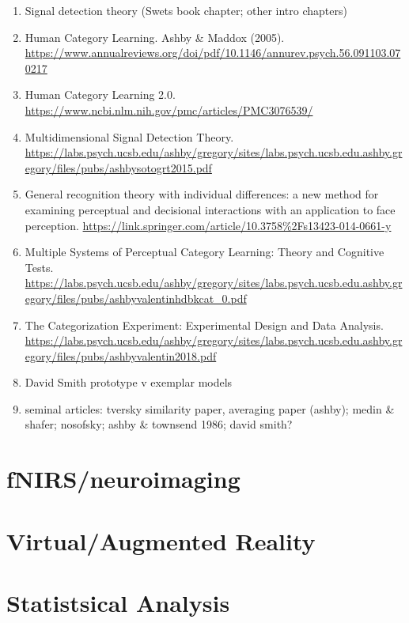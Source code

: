 \documentclass[
]{book}
\providecommand{\tightlist}{%
  \setlength{\itemsep}{0pt}\setlength{\parskip}{0pt}}
\begin{document}
\begin{enumerate}
\def\labelenumi{\arabic{enumi}.}
\setcounter{enumi}{-1}
\tightlist
\item
  Signal detection theory (Swets book chapter; other intro chapters)
\item
  Human Category Learning. Ashby \& Maddox (2005). \url{https://www.annualreviews.org/doi/pdf/10.1146/annurev.psych.56.091103.070217}
\item
  Human Category Learning 2.0. \url{https://www.ncbi.nlm.nih.gov/pmc/articles/PMC3076539/}
\item
  Multidimensional Signal Detection Theory. \url{https://labs.psych.ucsb.edu/ashby/gregory/sites/labs.psych.ucsb.edu.ashby.gregory/files/pubs/ashbysotogrt2015.pdf}
\item
  General recognition theory with individual differences: a new method for examining perceptual and decisional interactions with an application to face perception. \url{https://link.springer.com/article/10.3758\%2Fs13423-014-0661-y}
\item
  Multiple Systems of Perceptual
  Category Learning: Theory and
  Cognitive Tests. \url{https://labs.psych.ucsb.edu/ashby/gregory/sites/labs.psych.ucsb.edu.ashby.gregory/files/pubs/ashbyvalentinhdbkcat_0.pdf}
\item
  The Categorization Experiment:
  Experimental Design and Data Analysis. \url{https://labs.psych.ucsb.edu/ashby/gregory/sites/labs.psych.ucsb.edu.ashby.gregory/files/pubs/ashbyvalentin2018.pdf}
\item
  David Smith prototype v exemplar models
\item
  seminal articles: tversky similarity paper, averaging paper (ashby); medin \& shafer; nosofsky; ashby \& townsend 1986; david smith?
\end{enumerate}

\hypertarget{fnirsneuroimaging}{%
\section{fNIRS/neuroimaging}\label{fnirsneuroimaging}}

\hypertarget{virtualaugmented-reality}{%
\section{Virtual/Augmented Reality}\label{virtualaugmented-reality}}

\hypertarget{statistsical-analysis}{%
\section{Statistsical Analysis}\label{statistsical-analysis}}
\end{document}
